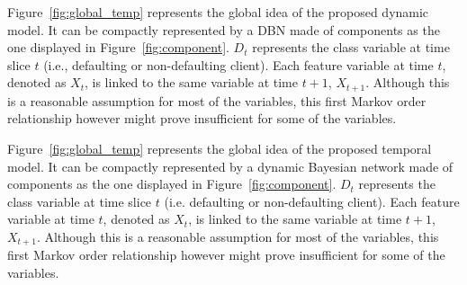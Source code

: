 
%  
%  
%  
%  
%  


Figure~\ref{fig:global_temp} represents the global idea of the proposed dynamic model. It can be compactly represented by a DBN made of components as the one displayed in 
Figure~\ref{fig:component}. $D_t$ represents the class variable at time slice $t$ (i.e., defaulting or non-defaulting client). Each feature variable at time $t$, denoted as $X_t$, is linked to the same variable at time $t+1$, $X_{t+1}$. Although this is a reasonable assumption for most of the variables, this first Markov order relationship however might prove insufficient for some of the variables.

Figure~\ref{fig:global_temp} represents the global idea of the proposed temporal model. It can be compactly represented by a dynamic Bayesian network made of components as the one displayed in 
Figure~\ref{fig:component}. $D_t$ represents the class variable at time slice $t$ (i.e. defaulting or non-defaulting client). Each feature variable at time $t$, denoted as $X_t$, is linked to the same variable at time $t+1$, $X_{t+1}$. Although this is a reasonable assumption for most of the variables, this first Markov order relationship however might prove insufficient for some of the variables.

